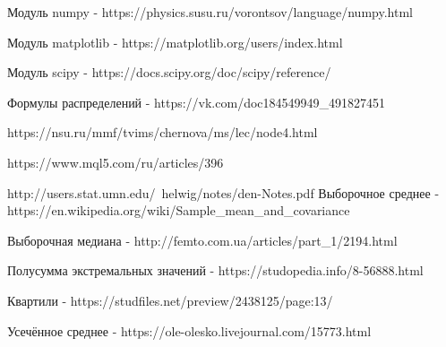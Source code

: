 \documentclass[a4]{article}
\begin{document}
\begin{thebibliography}{}
  Модуль numpy  -  https://physics.susu.ru/vorontsov/language/numpy.html
    
    Модуль matplotlib - https://matplotlib.org/users/index.html
    
    Модуль scipy - https://docs.scipy.org/doc/scipy/reference/
    
    Формулы распределений  -  https://vk.com/doc184549949\_491827451
    
    https://nsu.ru/mmf/tvims/chernova/ms/lec/node4.html
    
    https://www.mql5.com/ru/articles/396
    
    http://users.stat.umn.edu/~helwig/notes/den-Notes.pdf
    Выборочное среднее  -  https://en.wikipedia.org/wiki/Sample\_mean\_and\_covariance
    
    Выборочная медиана  -  http://femto.com.ua/articles/part\_1/2194.html
    
    Полусумма экстремальных значений  -  https://studopedia.info/8-56888.html
    
    Квартили  -  https://studfiles.net/preview/2438125/page:13/
    
      Усечённое среднее  -  https://ole-olesko.livejournal.com/15773.html
\end{thebibliography}
\end{document}
